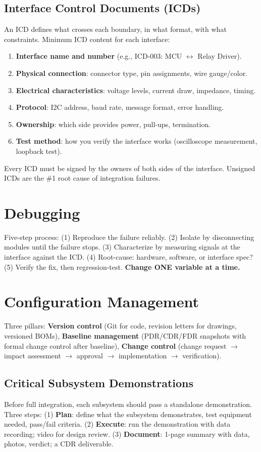 \documentclass[11pt,letterpaper,twoside,openany]{book}
\begin{document}
\subsection{Interface Control Documents (ICDs)}
An ICD defines what crosses each boundary, in what format, with what constraints. Minimum ICD content for each interface:
\begin{enumerate}[nosep,leftmargin=1.5em]
\item \textbf{Interface name and number} (e.g., ICD-003: MCU $\leftrightarrow$ Relay Driver).
\item \textbf{Physical connection}: connector type, pin assignments, wire gauge/color.
\item \textbf{Electrical characteristics}: voltage levels, current draw, impedance, timing.
\item \textbf{Protocol}: I2C address, baud rate, message format, error handling.
\item \textbf{Ownership}: which side provides power, pull-ups, termination.
\item \textbf{Test method}: how you verify the interface works (oscilloscope measurement, loopback test).
\end{enumerate}

Every ICD must be signed by the owners of both sides of the interface. Unsigned ICDs are the \#1 root cause of integration failures.

\section{Debugging}
Five-step process: (1) Reproduce the failure reliably. (2) Isolate by disconnecting modules until the failure stops. (3) Characterize by measuring signals at the interface against the ICD. (4) Root-cause: hardware, software, or interface spec? (5) Verify the fix, then regression-test. \textbf{Change ONE variable at a time.}

\section{Configuration Management}
Three pillars: \textbf{Version control} (Git for code, revision letters for drawings, versioned BOMs), \textbf{Baseline management} (PDR/CDR/FDR snapshots with formal change control after baseline), \textbf{Change control} (change request $\to$ impact assessment $\to$ approval $\to$ implementation $\to$ verification).


\subsection{Critical Subsystem Demonstrations}
Before full integration, each subsystem should pass a standalone demonstration. Three steps: (1) \textbf{Plan}: define what the subsystem demonstrates, test equipment needed, pass/fail criteria. (2) \textbf{Execute}: run the demonstration with data recording; video for design review. (3) \textbf{Document}: 1-page summary with data, photos, verdict; a CDR deliverable.
\end{document}
